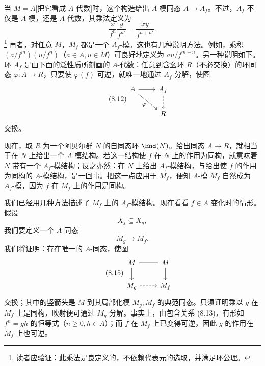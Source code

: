 当 $M=A$[把它看成 $A$-代数]时，这个构造给出 $A$-模同态 $A\to A_f$。不过，$A_f$ 不仅是 $A$-模，还是 $A$-代数，其乘法定义为
\begin{equation}\tag{8.11}
\frac{x}{f^n}\frac{y}{f^{n'}}=\frac{xy}{f^{n+n'}}.
\end{equation}
\footnote{读者应验证：此乘法是良定义的，不依赖代表元的选取，并满足环公理。}
再者，对任意 $M$，$M_f$ 都是一个 $A_f$-模。这也有几种说明方法。例如，乘积 $(a/f^m)(u/f^n)$（$a\in A,u\in M$）可良好地定义为 $au/f^{m+n}$。另一种说明如下。
环 $A_f$ 是由下面的泛性质所刻画的 $A$-代数：任意到含幺环 $R$（不必交换）的环同态 $\varphi:A\to R$，只要使 $\varphi(f)$ 可逆，就唯一地通过 $A_f$ 分解，使图
\begin{equation}\tag{8.12}
\begin{tikzcd}[ampersand replacement=\&]
A\arrow[r]\arrow[dr,"\varphi"']\&A_f\arrow[d,dashed]\\
\&R
\end{tikzcd}
\end{equation}
交换。

现在，取 $R$ 为一个阿贝尔群 $N$ 的自同态环 $\End(N)$。给出同态 $A\to R$，就相当于在 $N$ 上给出一个 $A$-模结构。若这一结构使 $f$ 在 $N$ 上的作用为同构，就意味着 $N$ 带有一个 $A_f$-模结构；反之亦然：在 $N$ 上给出 $A_f$-模结构，与给出使 $f$ 的作用为同构的 $A$-模结构，是一回事。把这一点应用于 $M_f$，便知 $A$-模 $M_f$ 自然成为 $A_f$-模，因为 $f$ 在 $M_f$ 上的作用是同构。

我们已经用几种方法描述了 $M_f$ 上的 $A_f$-模结构。现在看看 $f\in A$ 变化时的情形。假设
\begin{equation}\tag{8.13}
X_f\subseteq X_g,
\end{equation}
我们要定义一个 $A$-同态
\begin{equation}\tag{8.14}
M_g\longrightarrow M_f.
\end{equation}
我们将证明：存在唯一的 $A$-同态，使图
\begin{equation}\tag{8.15}
\begin{tikzcd}[ampersand replacement=\&]
M\arrow[r,equal]\arrow[d]\&M\arrow[d]\\
M_g\arrow[r,dashed]\&M_f
\end{tikzcd}
\end{equation}
交换；其中的竖箭头是 $M$ 到其局部化模 $M_g,M_f$ 的典范同态。只须证明乘以 $g$ 在 $M_f$ 上是同构，映射便可通过 $M_g$ 分解。事实上，由包含关系 (8.13)，有形如 $f^n=gh$ 的恒等式（$n\ge0,h\in A$）；而 $f$ 在 $M_f$ 上已变得可逆，因此 $g$ 的作用在 $M_f$ 上也可逆。

